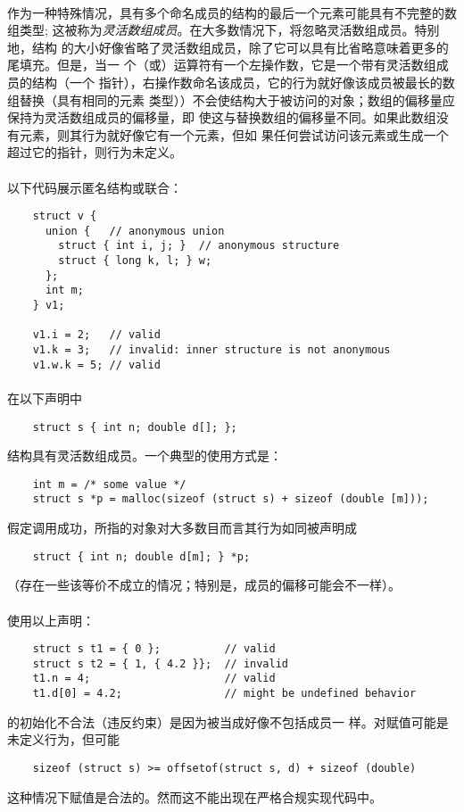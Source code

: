 {\paragraph{}
作为一种特殊情况，具有多个命名成员的结构的最后一个元素可能具有不完整的数组类型;
这被称为\textit{灵活数组成员}。在大多数情况下，将忽略灵活数组成员。特别地，结构
的大小好像省略了灵活数组成员，除了它可以具有比省略意味着更多的尾填充。但是，当一
个（或\tm{->}）运算符有一个左操作数，它是一个带有灵活数组成员的结构（一个
指针），右操作数命名该成员，它的行为就好像该成员被最长的数组替换（具有相同的元素
类型））不会使结构大于被访问的对象；数组的偏移量应保持为灵活数组成员的偏移量，即
使这与替换数组的偏移量不同。如果此数组没有元素，则其行为就好像它有一个元素，但如
果任何尝试访问该元素或生成一个超过它的指针，则行为未定义。

\paragraph{}
\ex 以下代码展示匿名结构或联合：
\begin{lstlisting}
    struct v {
      union {   // anonymous union
        struct { int i, j; }  // anonymous structure
        struct { long k, l; } w;
      };
      int m;
    } v1;

    v1.i = 2;   // valid
    v1.k = 3;   // invalid: inner structure is not anonymous
    v1.w.k = 5; // valid
\end{lstlisting}

\paragraph{}
\ex 在以下声明中
\begin{lstlisting}
    struct s { int n; double d[]; };
\end{lstlisting}
结构具有灵活数组成员。一个典型的使用方式是：
\begin{lstlisting}
    int m = /* some value */
    struct s *p = malloc(sizeof (struct s) + sizeof (double [m]));
\end{lstlisting}
假定调用成功，所指的对象对大多数目而言其行为如同被声明成
\begin{lstlisting}
    struct { int n; double d[m]; } *p;
\end{lstlisting}
（存在一些该等价不成立的情况；特别是，成员的偏移可能会不一样）。

\paragraph{}
使用以上声明：
\begin{lstlisting}
    struct s t1 = { 0 };          // valid
    struct s t2 = { 1, { 4.2 }};  // invalid
    t1.n = 4;                     // valid
    t1.d[0] = 4.2;                // might be undefined behavior
\end{lstlisting}
的初始化不合法（违反约束）是因为被当成好像不包括成员一
样。对赋值可能是未定义行为，但可能
\begin{lstlisting}
    sizeof (struct s) >= offsetof(struct s, d) + sizeof (double)
\end{lstlisting}
这种情况下赋值是合法的。然而这不能出现在严格合规实现代码中。

}
